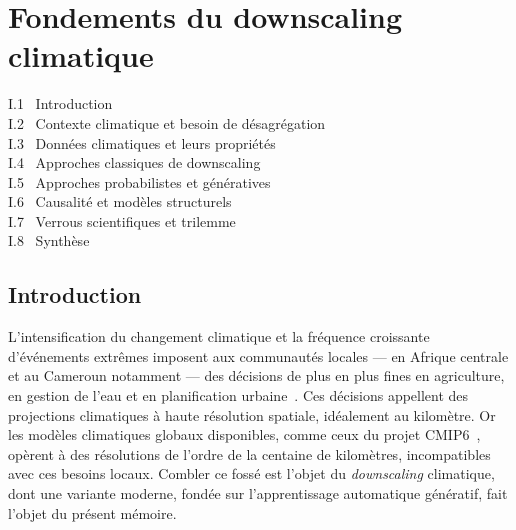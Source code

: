 \documentclass[14pt,a4paper,openany]{extreport}
\theoremstyle{definition}
\begin{document}

\chapter{Fondements du downscaling climatique}
\label{chap:fondements}

\begin{sommairebox}
\small
\noindent I.1 \ Introduction \dotfill \pageref{sec:intro}\\
\noindent I.2 \ Contexte climatique et besoin de désagrégation \dotfill \pageref{sec:contexte}\\
\noindent I.3 \ Données climatiques et leurs propriétés \dotfill \pageref{sec:donnees}\\
\noindent I.4 \ Approches classiques de downscaling \dotfill \pageref{sec:classiques}\\
\noindent I.5 \ Approches probabilistes et génératives \dotfill \pageref{sec:generatifs}\\
\noindent I.6 \ Causalité et modèles structurels \dotfill \pageref{sec:causalite}\\
\noindent I.7 \ Verrous scientifiques et trilemme \dotfill \pageref{sec:verrous}\\
\noindent I.8 \ Synthèse \dotfill \pageref{sec:synthese}
\end{sommairebox}

\vspace{1.5em}

\section{Introduction}
\label{sec:intro}

L'intensification du changement climatique et la fréquence croissante d'événements extrêmes imposent aux communautés locales --- en Afrique centrale et au Cameroun notamment --- des décisions de plus en plus fines en agriculture, en gestion de l'eau et en planification urbaine~\cite{ipcc_ar6_2021}. Ces décisions appellent des projections climatiques à haute résolution spatiale, idéalement au kilomètre. Or les modèles climatiques globaux disponibles, comme ceux du projet CMIP6~\cite{eyring_cmip6_2016}, opèrent à des résolutions de l'ordre de la centaine de kilomètres, incompatibles avec ces besoins locaux. Combler ce fossé est l'objet du \emph{downscaling} climatique, dont une variante moderne, fondée sur l'apprentissage automatique génératif, fait l'objet du présent mémoire.
\end{document}
